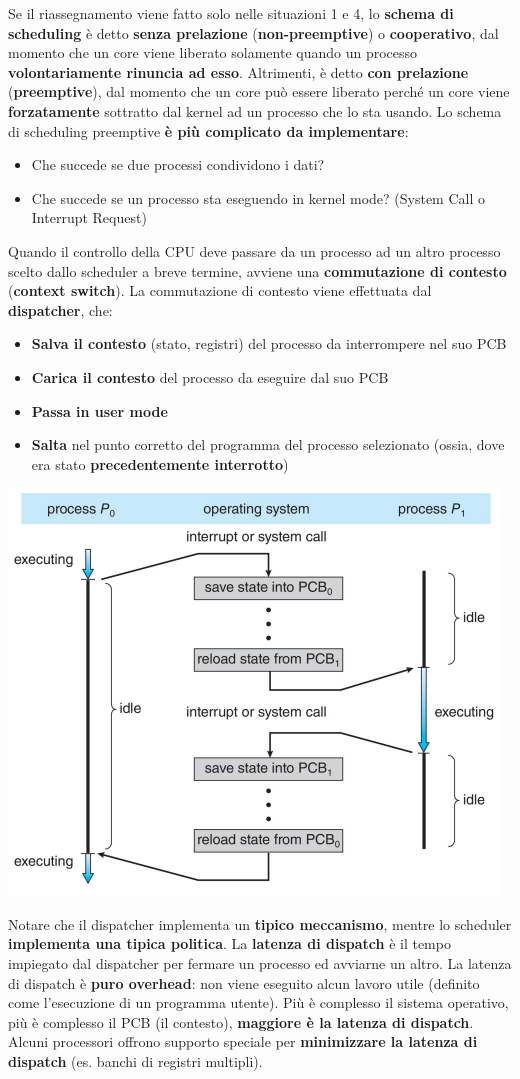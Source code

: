 \documentclass[12pt]{article}
\begin{document}
Se il riassegnamento viene fatto solo nelle situazioni 1 e 4, lo \textbf{schema di scheduling} è detto \textbf{senza prelazione} (\textbf{non-preemptive}) o \textbf{cooperativo}, dal momento che un core viene liberato
solamente quando un processo \textbf{volontariamente rinuncia ad esso}.
Altrimenti, è detto \textbf{con prelazione} (\textbf{preemptive}), dal momento che un core può essere liberato perché un core viene \textbf{forzatamente} sottratto dal kernel ad un processo che lo sta usando.
Lo schema di scheduling preemptive \textbf{è più complicato da implementare}:
\begin{itemize}
    \item Che succede se due processi condividono i dati?
    \item Che succede se un processo sta eseguendo in kernel mode? (System Call o Interrupt Request)
\end{itemize}
Quando il controllo della CPU deve passare da un processo ad un altro processo scelto dallo scheduler a breve termine, avviene una \textbf{commutazione di contesto} (\textbf{context switch}).
La commutazione di contesto viene effettuata dal \textbf{dispatcher}, che:
\begin{itemize}
    \item \textbf{Salva il contesto} (stato, registri) del processo da interrompere nel suo PCB
    \item \textbf{Carica il contesto} del processo da eseguire dal suo PCB
    \item \textbf{Passa in user mode}
    \item \textbf{Salta} nel punto corretto del programma del processo selezionato (ossia, dove era stato \textbf{precedentemente interrotto})
\end{itemize}
\begin{center}
    \includegraphics[width = 0.60\linewidth]{Images/41.png}
\end{center}
Notare che il dispatcher implementa un \textbf{tipico meccanismo}, mentre lo scheduler \textbf{implementa una tipica politica}.
La \textbf{latenza di dispatch} è il tempo impiegato dal dispatcher per fermare un processo ed avviarne un altro. La latenza di dispatch
è \textbf{puro overhead}: non viene eseguito alcun lavoro utile (definito come l'esecuzione di un programma utente).
Più è complesso il sistema operativo, più è complesso il PCB (il contesto), \textbf{maggiore è la latenza di dispatch}.
Alcuni processori offrono supporto speciale per \textbf{minimizzare la latenza di dispatch} (es. banchi di registri multipli).
\end{document}
